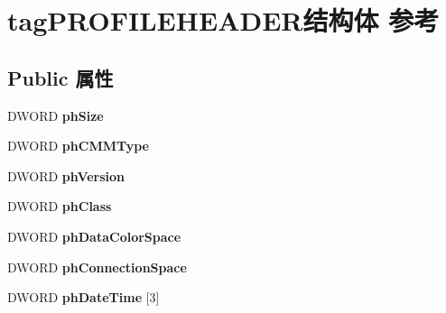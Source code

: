 \hypertarget{structtag_p_r_o_f_i_l_e_h_e_a_d_e_r}{}\section{tag\+P\+R\+O\+F\+I\+L\+E\+H\+E\+A\+D\+E\+R结构体 参考}
\label{structtag_p_r_o_f_i_l_e_h_e_a_d_e_r}
\subsection*{Public 属性}
\begin{DoxyCompactItemize}
\item 
\mbox{\label{structtag_p_r_o_f_i_l_e_h_e_a_d_e_r_a04e68f6f69470eb5e1ad1cba9b48742e}} 
D\+W\+O\+RD {\bfseries ph\+Size}
\item 
\mbox{\label{structtag_p_r_o_f_i_l_e_h_e_a_d_e_r_a037a29065d79b506f1fd0fdfaa0c5d1e}} 
D\+W\+O\+RD {\bfseries ph\+C\+M\+M\+Type}
\item 
\mbox{\label{structtag_p_r_o_f_i_l_e_h_e_a_d_e_r_a8cb06831ddacafa6bf3c741c8982d8df}} 
D\+W\+O\+RD {\bfseries ph\+Version}
\item 
\mbox{\label{structtag_p_r_o_f_i_l_e_h_e_a_d_e_r_a0f9da9489e45dd6ee665f53177e534ee}} 
D\+W\+O\+RD {\bfseries ph\+Class}
\item 
\mbox{\label{structtag_p_r_o_f_i_l_e_h_e_a_d_e_r_ad26a99c035cbf9cafec1b4ea184b1242}} 
D\+W\+O\+RD {\bfseries ph\+Data\+Color\+Space}
\item 
\mbox{\label{structtag_p_r_o_f_i_l_e_h_e_a_d_e_r_a71d4e92d5c6155f3dc5883a79a88c4cf}} 
D\+W\+O\+RD {\bfseries ph\+Connection\+Space}
\item 
\mbox{\label{structtag_p_r_o_f_i_l_e_h_e_a_d_e_r_a02f920f16fdc7528e343083621a631c1}} 
D\+W\+O\+RD {\bfseries ph\+Date\+Time} \mbox{[}3\mbox{]}
\item 
\mbox{\label{structtag_p_r_o_f_i_l_e_h_e_a_d_e_r_a61c99340a0a74c1ed425d26493f3379b}} 

\end{DoxyCompactItemize}
